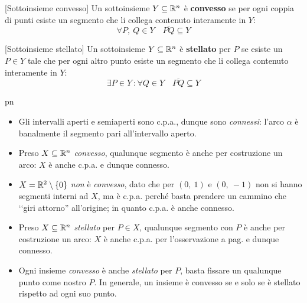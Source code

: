 \begin{definition}{}[Sottoinsieme convesso]
	Un sottoinsieme $Y\subseteq\mathbb{R}^n$ è \textbf{convesso} se per ogni coppia di punti esiste un segmento che li collega contenuto interamente in $Y$:
	\begin{equation}
		\forall P,\ Q\in Y\quad \overline{PQ}\subseteq Y
	\end{equation}
\end{definition}
\begin{definition}{}[Sottoinsieme stellato]
	Un sottoinsieme $Y\subseteq\mathbb{R}^n$ è \textbf{stellato} per $P$ se esiste un $P\in Y$ tale che per ogni altro punto esiste un segmento che li collega contenuto interamente in $Y$:
	\begin{equation}
		\exists P \in Y\ \colon \forall Q\in Y\quad \overline{PQ}\subseteq Y
	\end{equation}
\end{definition}
\begin{example}{pn}~{}
\begin{itemize}
	\item Gli intervalli aperti e semiaperti sono c.p.a., dunque sono \textit{connessi}: l'arco $\alpha$ è banalmente il segmento pari all'intervallo aperto.
	\item Preso $X\subseteq\mathbb{R}^n$ \textit{convesso}, qualunque segmento è anche per costruzione un arco: $X$ è anche c.p.a. e dunque connesso.
	\item $X=\mathbb{R}^{2}\setminus\left\{0\right\}$ \textit{non} è \textit{convesso}, dato che per $\left(0,\ 1\right)$ e $\left(0,\ -1\right)$ non si hanno segmenti interni ad $X$, ma è c.p.a. perché basta prendere un cammino che ‘‘giri attorno'' all'origine; in quanto c.p.a. è anche connesso.
	\item Preso $X\subseteq\mathbb{R}^n$ \textit{stellato} per $P\in X$, qualunque segmento con $P$ è anche per costruzione un arco: $X$ è anche c.p.a. per l'osservazione a pag. \pageref{giunzionecpa} e dunque {connesso}.
	\item Ogni insieme \textit{convesso} è anche \textit{stellato} per $P$, basta fissare un qualunque punto come nostro $P$. In generale, un insieme è convesso se e solo se è stellato rispetto ad ogni suo punto.
\end{itemize}
\end{example}
